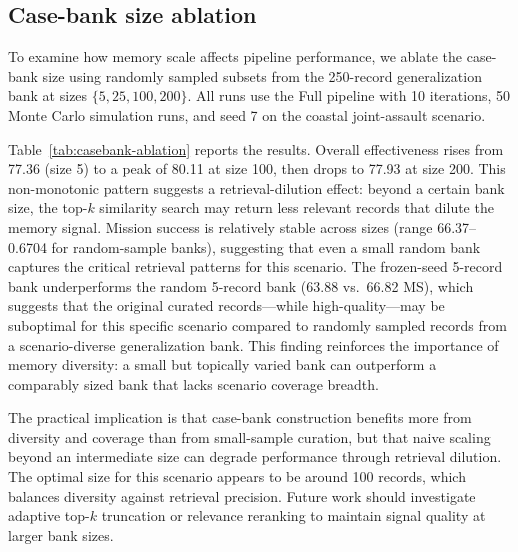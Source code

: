 \subsection{Case-bank size ablation}

To examine how memory scale affects pipeline performance, we ablate the case-bank size using randomly sampled subsets from the 250-record generalization bank at sizes $\{5, 25, 100, 200\}$. All runs use the Full pipeline with 10 iterations, 50 Monte Carlo simulation runs, and seed 7 on the coastal joint-assault scenario.

Table~\ref{tab:casebank-ablation} reports the results. Overall effectiveness rises from 77.36 (size 5) to a peak of 80.11 at size 100, then drops to 77.93 at size 200. This non-monotonic pattern suggests a retrieval-dilution effect: beyond a certain bank size, the top-$k$ similarity search may return less relevant records that dilute the memory signal. Mission success is relatively stable across sizes (range 66.37--0.6704 for random-sample banks), suggesting that even a small random bank captures the critical retrieval patterns for this scenario. The frozen-seed 5-record bank underperforms the random 5-record bank (63.88 vs.\ 66.82 MS), which suggests that the original curated records---while high-quality---may be suboptimal for this specific scenario compared to randomly sampled records from a scenario-diverse generalization bank. This finding reinforces the importance of memory diversity: a small but topically varied bank can outperform a comparably sized bank that lacks scenario coverage breadth.

The practical implication is that case-bank construction benefits more from diversity and coverage than from small-sample curation, but that naive scaling beyond an intermediate size can degrade performance through retrieval dilution. The optimal size for this scenario appears to be around 100 records, which balances diversity against retrieval precision. Future work should investigate adaptive top-$k$ truncation or relevance reranking to maintain signal quality at larger bank sizes.

